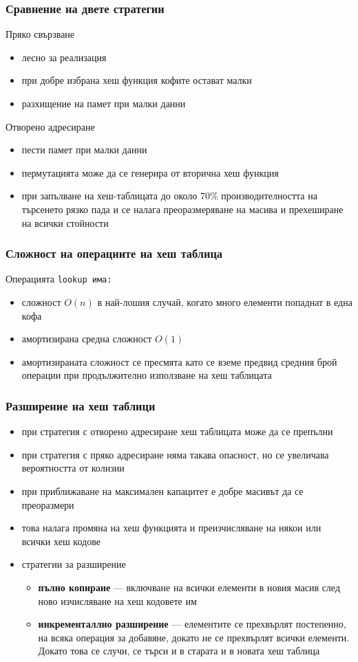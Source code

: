 \documentclass[alsotrans]{beamerswitch}
\begin{document}
\begin{frame}
  \frametitle{Сравнение на двете стратегии}
  Пряко свързване
  \begin{itemize}[<+->]
  \item лесно за реализация
  \item при добре избрана хеш функция кофите остават малки
  \item разхищение на памет при малки данни
  \end{itemize}
  \onslide<+->
  Отворено адресиране
  \begin{itemize}[<+->]
  \item пести памет при малки данни
  \item пермутацията може да се генерира от вторична хеш функция
  \item при запълване на хеш-таблицата до около 70\% производителността на търсенето рязко пада и се налага преоразмеряване на масива и прехеширане на всички стойности
  \end{itemize}
\end{frame}

\begin{frame}
  \frametitle{Сложност на операциите на хеш таблица}
  Операцията \tt{lookup} има:
  \begin{itemize}[<+->]
  \item сложност $O(n)$ в най-лошия случай, когато много елементи попаднат в една кофа
  \item \alert{амортизирана средна сложност $O(1)$}
  \item амортизираната сложност се пресмята като се вземе предвид средния брой операции при продължително използване на хеш таблицата
  \end{itemize}
\end{frame}

\begin{frame}
  \frametitle{Разширение на хеш таблици}
  \begin{itemize}[<+->]
  \item при стратегия с отворено адресиране хеш таблицата може да се препълни
  \item при стратегия с пряко адресиране няма такава опасност, но се увеличава вероятността от колизии
  \item при приближаване на максимален капацитет е добре масивът да се преоразмери
  \item това налага промяна на хеш функцията и преизчисляване на някои или всички хеш кодове
  \item стратегии за разширение
    \begin{itemize}
    \item \textbf{пълно копиране} --- включване на всички елементи в новия масив след ново изчисляване на хеш кодовете им
    \item \textbf{инкременталлно разширение} --- елементите се прехвърлят постепенно, на всяка операция за добавяне, докато не се прехвърлят всички елементи. Докато това се случи, се търси и в старата и в новата хеш таблица
    \end{itemize}
  \end{itemize}
\end{frame}
\end{document}
